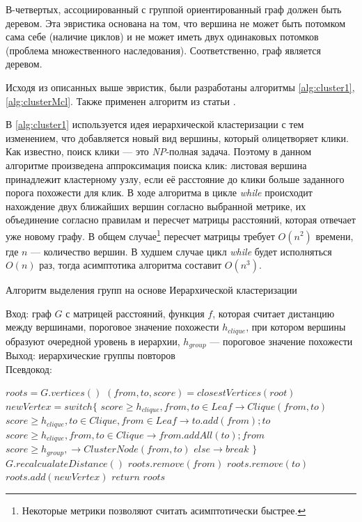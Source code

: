 В-четвертых, ассоциированный с группой ориентированный граф должен быть деревом.
Эта эвристика основана на том, что вершина не может быть потомком сама себе (наличие циклов) и не может иметь двух одинаковых потомков (проблема множественного наследования).
Соответственно, граф является деревом.  

Исходя из описанных выше эвристик, были разработаны алгоритмы \ref{alg:cluster1}, \ref{alg:clusterMcl}.
Также применен алгоритм из статьи \cite{tofigh2009optimum}.

% 
В \ref{alg:cluster1} используется идея иерархической кластеризации с тем изменением, что добавляется новый вид вершины, который олицетворяет клики.
Как известно, поиск клики --- это \emph{NP}-полная задача.
Поэтому в данном алгоритме произведена аппроксимация поиска клик:
листовая вершина принадлежит кластерному узлу, если её  расстояние до клики больше заданного порога похожести для клик.
В ходе алгоритма в цикле \emph{while} происходит нахождение двух ближайших вершин согласно выбранной метрике, их объединение согласно правилам и пересчет матрицы расстояний, которая отвечает уже новому графу.
В общем случае\footnote{Некоторые метрики позволяют считать асимптотически быстрее.} пересчет матрицы требует $O(n^2)$ времени, где $n$ --- количество вершин.
В худшем случае  цикл \emph{while} будет исполняться $O(n)$ раз,
тогда асимптотика алгоритма составит $O(n^3)$.

\begin{algorithm}[h]
\caption{Алгоритм выделения групп на основе Иерархической кластеризации}\label{alg:cluster1}
Вход: граф $G$ с матрицей расстояний, функция  $f$, которая считает дистанцию между вершинами, пороговое значение похожести $h_{clique}$, при котором вершины образуют очередной уровень в иерархии, $h_{group}$ --- пороговое значение похожести\\
Выход: иерархические группы повторов \\
Псевдокод:
\begin{algorithmic}[1]
\State $roots = G.vertices()$
\State $(from, to,score) = closestVertices(root)$
\State $newVertex = switch \{$
\State $score\geq h_{clique} , from,to \in Leaf \rightarrow Clique(from,to) $
\State $score\geq h_{clique} , to \in Clique,from \in Leaf \rightarrow to.add(from);to $
\State $score\geq h_{clique} , from,to \in Clique \rightarrow from.addAll(to);from$
\State $score\geq h_{group}, \rightarrow ClusterNode(from,to) $
\State $else \rightarrow break$ 
\State $\}$
\State $G.recalcualateDistance()$
\State $roots.remove(from)$
\State $roots.remove(to)$
\State $roots.add(newVertex)$
\EndWhile
\State $return$ $roots$
\end{algorithmic}
\end{algorithm}

